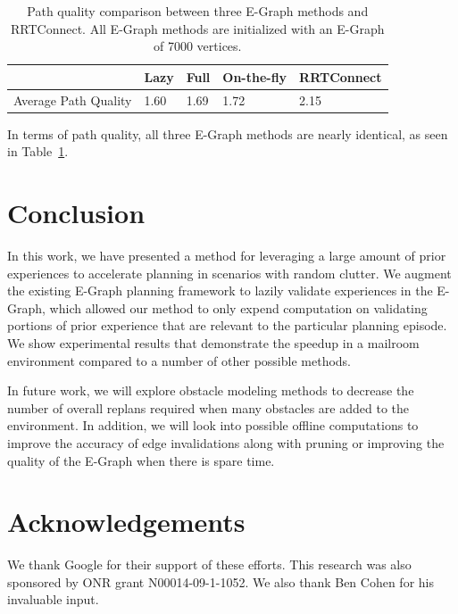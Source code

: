 \documentclass[letterpaper, 10 pt, conference]{ieeeconf}  %
\newcommand{\tabref}[1]{Table~\ref{tab:#1}}
\newcommand{\tablab}[1]{\label{tab:#1}}
\begin{document}
\begin{table}[t]
    \begin{center}
        \begin{tabular}{| l | l | l | l | l | }
            \hline
            & Lazy & Full & On-the-fly & RRTConnect \\ \hline
            Average Path Quality & 1.60 & 1.69 & 1.72 & 2.15 \\ \hline
        \end{tabular}
    \end{center}
    \caption{Path quality comparison between three E-Graph methods and
    RRTConnect. All E-Graph methods are initialized with an E-Graph of 7000
vertices.}
    \tablab{pquality}
\end{table}

In terms of path quality, all three E-Graph methods are nearly identical, as
seen in \tabref{pquality}.

\section{Conclusion}
In this work, we have presented a method for leveraging a large amount of prior
experiences to accelerate planning in scenarios with random clutter. We augment
the existing E-Graph planning framework to lazily validate experiences in the
E-Graph, which allowed our method to only expend computation on validating portions
of prior experience that are relevant to the particular planning episode. We
show experimental results that demonstrate the speedup in a mailroom environment
compared to a number of other possible methods.

In future work, we will explore obstacle modeling methods to decrease the number
of overall replans required when many obstacles are added to the environment. In
addition, we will look into possible offline computations to improve
the accuracy of edge invalidations along with pruning or improving the quality
of the E-Graph when there is spare time.

\section{Acknowledgements}
We thank Google for their support of these efforts. This research was also sponsored by ONR grant N00014-09-1-1052.
We also thank Ben Cohen for his invaluable input.



\end{document}
